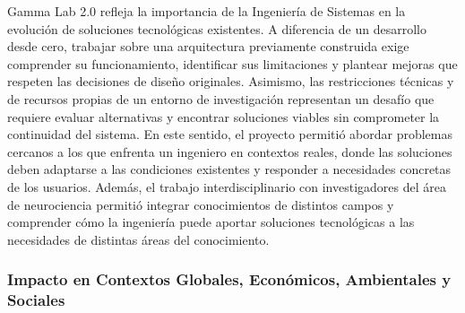 \documentclass[12pt,letterpaper,oneside]{article}
\begin{document}
Gamma Lab 2.0 refleja la importancia de la Ingeniería de Sistemas en la evolución de soluciones tecnológicas existentes. A diferencia de un desarrollo desde cero, trabajar sobre una arquitectura previamente construida exige comprender su funcionamiento, identificar sus limitaciones y plantear mejoras que respeten las decisiones de diseño originales. Asimismo, las restricciones técnicas y de recursos propias de un entorno de investigación representan un desafío que requiere evaluar alternativas y encontrar soluciones viables sin comprometer la continuidad del sistema. En este sentido, el proyecto permitió abordar problemas cercanos a los que enfrenta un ingeniero en contextos reales, donde las soluciones deben adaptarse a las condiciones existentes y responder a necesidades concretas de los usuarios. Además, el trabajo interdisciplinario con investigadores del área de neurociencia permitió integrar conocimientos de distintos campos y comprender cómo la ingeniería puede aportar soluciones tecnológicas a las necesidades de distintas áreas del conocimiento.

\subsubsection{Impacto en Contextos Globales, Económicos, Ambientales y Sociales}
\end{document}

